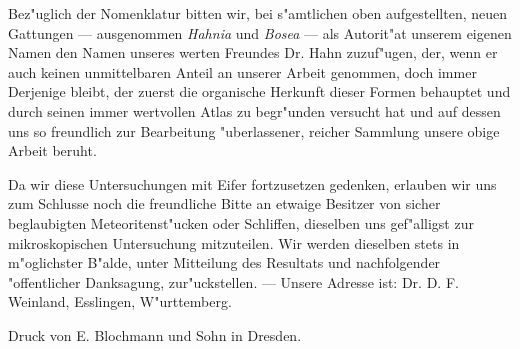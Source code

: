 \documentclass[a4paper, 11pt, oneside]{article}
\begin{document}
Bez"uglich der Nomenklatur bitten wir, bei s"amtlichen oben aufgestellten, neuen Gattungen --- ausgenommen \emph{Hahnia} und \emph{Bosea} --- als Autorit"at unserem eigenen Namen den Namen unseres werten Freundes Dr. Hahn zuzuf"ugen, der, wenn er auch keinen unmittelbaren Anteil an unserer Arbeit genommen, doch immer Derjenige bleibt, der zuerst die organische Herkunft dieser Formen behauptet und durch seinen immer wertvollen Atlas zu begr"unden versucht hat und auf dessen uns so freundlich zur Bearbeitung "uberlassener, reicher Sammlung unsere obige Arbeit beruht.

Da wir diese Untersuchungen mit Eifer fortzusetzen gedenken, erlauben wir uns zum Schlusse noch die freundliche Bitte an etwaige Besitzer von sicher beglaubigten Meteoritenst"ucken oder Schliffen, dieselben uns gef"alligst zur mikroskopischen Untersuchung mitzuteilen. Wir werden dieselben stets in m"oglichster B"alde, unter Mitteilung des Resultats und nachfolgender "offentlicher Danksagung, zur"uckstellen. --- Unsere Adresse ist: Dr. D. F. Weinland, Esslingen, W"urttemberg.

Druck von E. Blochmann und Sohn in Dresden.
\clearpage
\end{document}
